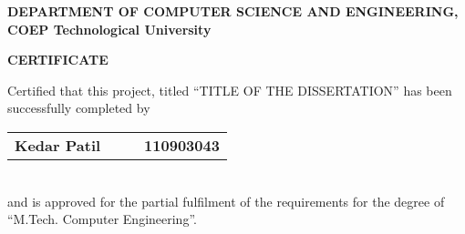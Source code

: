 % 
\thispagestyle{empty}
\linespread{2}
\begin{center}			%
	\Large{\bf{DEPARTMENT OF COMPUTER  SCIENCE AND ENGINEERING,\\ 
	       COEP Technological University\\}}	
\end{center}

\vspace{20pt}			%

\begin{center}
	\Large{\bf{CERTIFICATE\\}}
\end{center}

\vspace{20pt}

\linespread{2}			%
\selectfont
\large{
Certified that this project, titled ``TITLE OF THE DISSERTATION''
has been successfully completed by \\ 
\begin{table}[htbp]
	\begin{center}
	\begin{tabular}{ l c c l }
	\Large\bf{Kedar Patil} & & & \Large\bf{110903043} \\ [0.3cm]

	\end{tabular}
	\end{center}
	\end{table} \\
and is approved for the partial fulfilment of the requirements for the degree of 
``M.Tech. Computer Engineering''.
}

\vspace{100pt}

